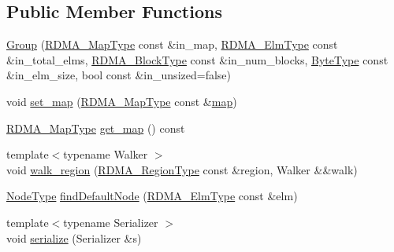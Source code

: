 \subsection*{Public Member Functions}
\begin{DoxyCompactItemize}
\item 
\hyperlink{structvt_1_1rdma_1_1_group_a2e4d5e75abc385ed0769de042b070d66}{Group} (\hyperlink{structvt_1_1rdma_1_1_group_a6a953be1b6d9907d49364a9a202d3379}{R\+D\+M\+A\+\_\+\+Map\+Type} const \&in\+\_\+map, \hyperlink{namespacevt_a2c2a902092b72056f70210c159f966f0}{R\+D\+M\+A\+\_\+\+Elm\+Type} const \&in\+\_\+total\+\_\+elms, \hyperlink{namespacevt_ae54d2ca8f6bb4d65faf65118c82cd6f7}{R\+D\+M\+A\+\_\+\+Block\+Type} const \&in\+\_\+num\+\_\+blocks, \hyperlink{namespacevt_aab8d55968084610ce3b17057981e9300}{Byte\+Type} const \&in\+\_\+elm\+\_\+size, bool const \&in\+\_\+unsized=false)
\item 
void \hyperlink{structvt_1_1rdma_1_1_group_a726d4eafcea7fa313ceabbb6938550a1}{set\+\_\+map} (\hyperlink{structvt_1_1rdma_1_1_group_a6a953be1b6d9907d49364a9a202d3379}{R\+D\+M\+A\+\_\+\+Map\+Type} const \&\hyperlink{structvt_1_1rdma_1_1_group_ab2d2df3f8a32c3230210ab7ce74c0e4e}{map})
\item 
\hyperlink{structvt_1_1rdma_1_1_group_a6a953be1b6d9907d49364a9a202d3379}{R\+D\+M\+A\+\_\+\+Map\+Type} \hyperlink{structvt_1_1rdma_1_1_group_a73a2d27f3ff477eb761d45c8b1bd6445}{get\+\_\+map} () const
\item 
{\footnotesize template$<$typename Walker $>$ }\\void \hyperlink{structvt_1_1rdma_1_1_group_a53c1941f50d8c724ea56c824cd514eee}{walk\+\_\+region} (\hyperlink{structvt_1_1rdma_1_1_group_a245644a7a0c40c547728a74e69c5e02f}{R\+D\+M\+A\+\_\+\+Region\+Type} const \&region, Walker \&\&walk)
\item 
\hyperlink{namespacevt_a866da9d0efc19c0a1ce79e9e492f47e2}{Node\+Type} \hyperlink{structvt_1_1rdma_1_1_group_aae5cb279219369b78d1c2f6d6b96fb56}{find\+Default\+Node} (\hyperlink{namespacevt_a2c2a902092b72056f70210c159f966f0}{R\+D\+M\+A\+\_\+\+Elm\+Type} const \&elm)
\item 
{\footnotesize template$<$typename Serializer $>$ }\\void \hyperlink{structvt_1_1rdma_1_1_group_ab30d45bdfa1cd597567b12ac950f4361}{serialize} (Serializer \&s)
\end{DoxyCompactItemize}
